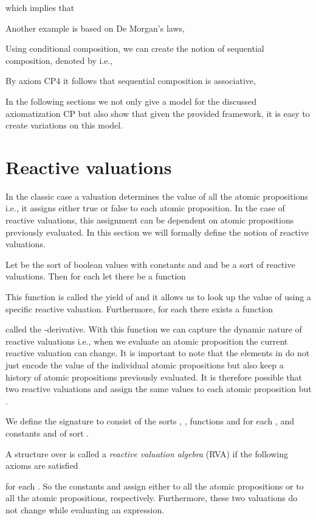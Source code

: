 \documentclass[a4paper,twoside,openright]{report}
\begin{document}
which implies that 

Another example is based on De Morgan's laws,


Using conditional composition, we can create the notion of sequential composition, denoted by  i.e.,

By axiom CP4 it follows that sequential composition is associative,

In the following sections we not only give a model for the discussed axiomatization CP but also show that given the provided framework, it is easy to create variations on this model.

\section{Reactive valuations}
In the classic case a valuation determines the value of all the atomic propositions  i.e., it assigns either true or false to each atomic proposition. In the case of reactive valuations, this assignment can be dependent on atomic propositions previously evaluated. In this section we will formally define the notion of reactive valuations.

Let  be the sort of boolean values with constants  and  and  be a sort of reactive valuations. Then for each  let there be a function

This function is called the yield of  and it allows us to look up the value of  using a specific reactive valuation. Furthermore, for each  there exists a function

called the -derivative. With this function we can capture the dynamic nature of reactive valuations i.e., when we evaluate an atomic proposition  the current reactive valuation can change. It is important to note that the elements in  do not just encode the value of the individual atomic propositions but also keep a history of atomic propositions previously evaluated. It is therefore possible that two reactive valuations  and  assign the same values to each atomic proposition but .

We define the signature  to consist of the sorts , , functions  and  for each , and constants  and  of sort .

A structure  over  is called a \emph{reactive valuation algebra} (RVA) if the following axioms are satisfied

for each . So the constants  and  assign either  to all the atomic propositions or  to all the atomic propositions, respectively. Furthermore, these two valuations do not change while evaluating an expression.
\end{document}
